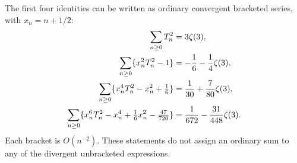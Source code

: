 The first four identities can be written as ordinary convergent
bracketed series, with $x_n=n+1/2$:
\begin{align}
 \sum_{n\ge0}T_n^2&=3\zeta(3),\notag\\
 \sum_{n\ge0}\{x_n^2T_n^2-1\}
        &=-\frac16-\frac14\zeta(3),\notag\\
 \sum_{n\ge0}\{x_n^4T_n^2-x_n^2+\tfrac16\}
        &=\frac1{30}+\frac7{80}\zeta(3),\label{hc:moment-examples}\\
 \sum_{n\ge0}\{x_n^6T_n^2-x_n^4+\tfrac16x_n^2-\tfrac{47}{720}\}
        &=\frac1{672}-\frac{31}{448}\zeta(3).\notag
\end{align}
Each bracket is $O(n^{-2})$. These statements do not assign an
ordinary sum to any of the divergent unbracketed expressions.

